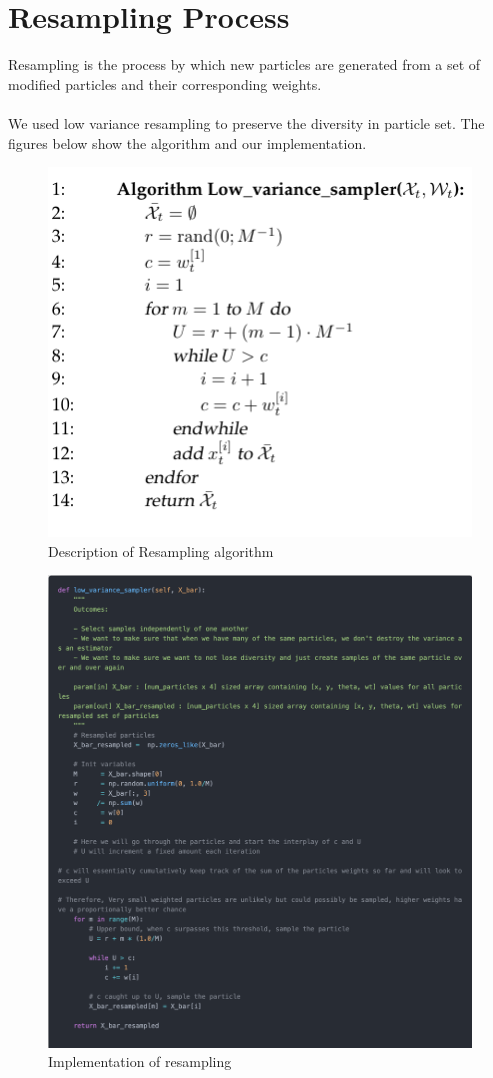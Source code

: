 \documentclass[12pt, a4paper]{article}
\begin{document}
\section{Resampling Process}
Resampling is the process by which new particles are generated from a set of modified particles and their corresponding weights.\\\\
We used low variance resampling to preserve the diversity in particle set. The figures below show the algorithm and our implementation.
\begin{figure}[H]
  \centering
  \includegraphics[width=0.9\linewidth]{results/resampling_1.png}
  \caption{Description of Resampling algorithm}
\end{figure}
\begin{figure}[H]
  \centering
  \includegraphics[width=0.9\linewidth]{results/resampling_2.png}
  \caption{Implementation of resampling}
\end{figure}
\end{document}
